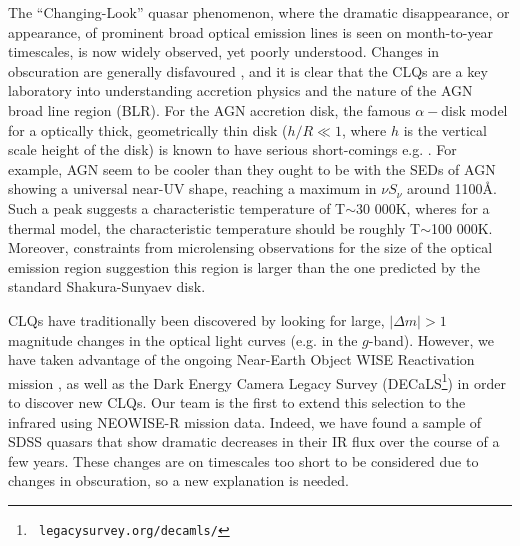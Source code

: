 \documentclass{nature}
\begin{document}

The ``Changing-Look'' quasar phenomenon, where the dramatic
disappearance, or appearance, of prominent broad optical emission
lines is seen on month-to-year timescales, is now widely observed,
\cite{LaMassa2015, MacLeod2016, Runnoe2016, Ruan2016, Gezari2017, Rumbaugh2017} 
yet poorly understood. Changes in obscuration are generally
disfavoured \cite{Hutsemekers2017, Sheng2017}, and it is clear that the
CLQs are a key laboratory into understanding accretion physics and the
nature of the AGN broad line region (BLR).
For the AGN accretion disk, the famous $\alpha-$disk model \cite{SS73}
for a optically thick, geometrically thin disk ($h / R \ll 1$, where
$h$ is the vertical scale height of the disk) is known to have serious
short-comings e.g. \cite{Antonucci1999, Koratkar_Blaes1999,
Lawrence2012}. For example, AGN seem to be cooler than they ought to be
\cite[e.g., ][]{Lawrence2012} with the SEDs of AGN showing a universal
near-UV shape, reaching a maximum in $\nu S_{\nu}$ around 1100\AA. 
Such a peak suggests a characteristic temperature of T$\sim$30 000K,
wheres for a thermal model, the characteristic temperature should be
roughly T$\sim$100 000K.  Moreover, constraints from microlensing
observations for the size of the optical emission region \cite[e.g.,
][]{Pooley2007, Morgan2010, Morgan2012, Mosquera2011} suggestion this region is
larger than the one predicted by the standard Shakura-Sunyaev disk.

CLQs have traditionally been discovered by looking for large, $|
\Delta m | >1$ magnitude changes in the optical light curves (e.g. in
the $g$-band). However, we have taken advantage of the ongoing
Near-Earth Object WISE Reactivation mission \cite[NEOWISE-R;
][]{Mainzer2014, Meisner2017, Meisner2017b}, as well as the Dark Energy
Camera Legacy Survey (DECaLS\footnote{{\tt
legacysurvey.org/decamls/}}) in order to discover new CLQs. Our team
is the first to extend this selection to the infrared using NEOWISE-R
mission data. Indeed, we have found a sample of SDSS quasars that show
dramatic decreases in their IR flux over the course of a few
years. These changes are on timescales too short to be considered due
to changes in obscuration, so a new explanation is needed.
\end{document}
